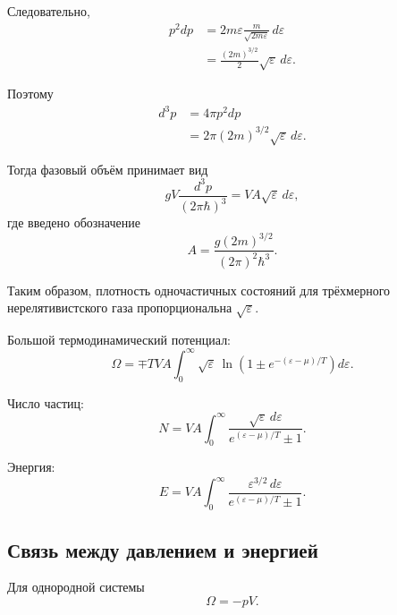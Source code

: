\documentclass[../final.tex]{subfiles}
\begin{document}
Следовательно,
%
\begin{align*}
    p^2dp
    &=
    2m\varepsilon
    \frac{m}{
        \sqrt{2m\varepsilon}
    }
    \,d\varepsilon
    \\[4pt]
    &=
    \frac{(2m)^{3/2}}{2}
    \sqrt{\varepsilon}\,
    d\varepsilon.
\end{align*}

Поэтому
%
\begin{align*}
    d^3p
    &=
    4\pi p^2dp
    \\[4pt]
    &=
    2\pi
    (2m)^{3/2}
    \sqrt{\varepsilon}\,
    d\varepsilon.
\end{align*}

Тогда фазовый объём принимает вид
%
\begin{equation*}
    gV
    \frac{d^3p}{
        (2\pi\hbar)^3
    }
    =
    VA
    \sqrt{\varepsilon}\,
    d\varepsilon,
\end{equation*}
%
где введено обозначение
%
\[
    \boxed{
        A
        =
        \frac{
            g(2m)^{3/2}
        }{
            (2\pi)^2\hbar^3
        }
    }.
\]

Таким образом, плотность одночастичных состояний для трёхмерного
нерелятивистского газа пропорциональна $\sqrt{\varepsilon}$.

Большой термодинамический потенциал:
%
\[
    \boxed{
        \Omega
        =
        \mp TVA
        \int_0^\infty
        \sqrt{\varepsilon}\,
        \ln
        \left(
            1
            \pm
            e^{-(\varepsilon-\mu)/T}
        \right)
        d\varepsilon
    }.
\]

Число частиц:
%
\[
    \boxed{
        N
        =
        VA
        \int_0^\infty
        \frac{
            \sqrt{\varepsilon}\,
            d\varepsilon
        }{
            e^{(\varepsilon-\mu)/T}\pm1
        }
    }.
\]

Энергия:
%
\[
    \boxed{
        E
        =
        VA
        \int_0^\infty
        \frac{
            \varepsilon^{3/2}\,
            d\varepsilon
        }{
            e^{(\varepsilon-\mu)/T}\pm1
        }
    }.
\]


\subsection{Связь между давлением и энергией}

Для однородной системы
%
\begin{equation*}
    \Omega
    =
    -pV.
\end{equation*}
\end{document}
